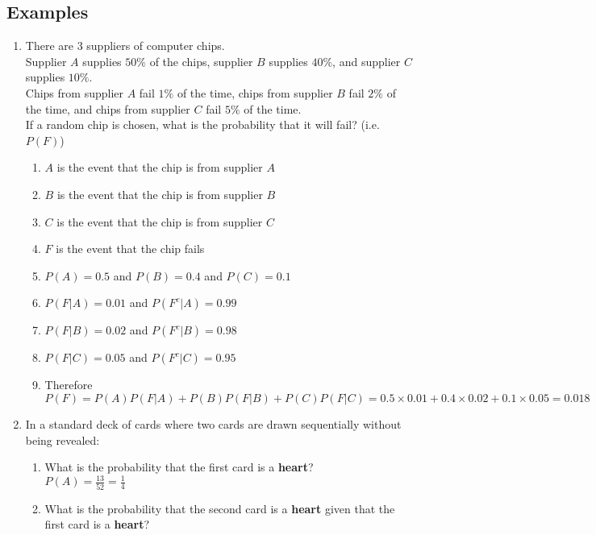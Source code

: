\documentclass[12pt]{article}
\begin{document}
        \subsection{Examples}
            \begin{enumerate}
                \item There are $3$ suppliers of computer chips.
                \\Supplier $A$ supplies $50\%$ of the chips, supplier $B$ supplies $40\%$, and supplier $C$ supplies $10\%$.
                \\Chips from supplier $A$ fail $1\%$ of the time, chips from supplier $B$ fail $2\%$ of the time, and chips from supplier $C$ fail $5\%$ of the time.
                \\If a random chip is chosen, what is the probability that it will fail? (i.e. $P(F)$)
                \begin{enumerate}
                    \item $A$ is the event that the chip is from supplier $A$
                    \item $B$ is the event that the chip is from supplier $B$
                    \item $C$ is the event that the chip is from supplier $C$
                    \item $F$ is the event that the chip fails
                    \item $P(A) = 0.5$ and $P(B) = 0.4$ and $P(C) = 0.1$
                    \item $P(F|A) = 0.01$ and $P(F^c|A) = 0.99$
                    \item $P(F|B) = 0.02$ and $P(F^c|B) = 0.98$
                    \item $P(F|C) = 0.05$ and $P(F^c|C) = 0.95$
                    \item Therefore $P(F) = P(A)P(F|A) + P(B)P(F|B) + P(C)P(F|C) = 0.5\times0.01 + 0.4\times0.02 + 0.1\times0.05 = 0.018$
                \end{enumerate}
                \item In a standard deck of cards where two cards are drawn sequentially without being revealed:
                \begin{enumerate}
                    \item What is the probability that the first card is a \textbf{heart}?
                    \\$P(A) = \frac{13}{52} = \frac{1}{4}$
                    \item What is the probability that the second card is a \textbf{heart} given that the first card is a \textbf{heart}?

\end{enumerate}
\end{enumerate}
\end{document}

